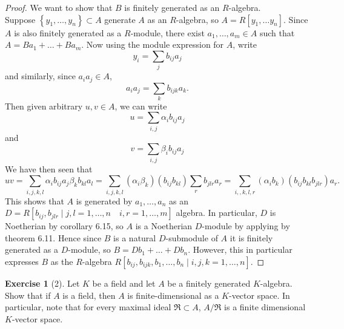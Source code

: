 \documentclass[reqno]{amsart}
\theoremstyle{definition}
\newtheorem{exercise}[theorem]{Exercise}
\theoremstyle{remark}
\begin{document}
    \begin{proof}
        We want to show that
        $B$ is finitely generated as an $R$-algebra.\\

        Suppose $\left\{ y_1, \ldots, y_n \right\} \subset A$
        generate $A$ as an $R$-algebra, so
        $A = R \left[ y_1, \ldots y_n \right] $.
        Since $A$ is also finitely generated
        as a $R$-module, there
        exist $a_1, \ldots, a_m \in A$ such that
        $A = Ba_1 + \ldots + Ba_m$.
        Now using the module expression for $A$, write
        \[
        y_i = \sum_j b_{ij} a_j
        \]
        and similarly, since
        $a_i a_j \in A$,
        \[
        a_i a_j = \sum_k b_{ijk} a_k.
        \]
        Then given arbitrary
        $u,v \in A$,
        we can write
        \[
        u = \sum_{i,j} \alpha_i b_{ij} a_{j}
        \]
        and
         \[
        v = \sum_{i,j} \beta_i b_{ij} a_{j}
        \]
        We have then seen that
        \[
        uv = \sum_{i,j,k,l} \alpha_i b_{ij} a_j \beta_k b_{kl}a_l
        = \sum_{i,j,k,l} \left( \alpha_i \beta_k \right)
        \left( b_{ij} b_{kl} \right) \sum_{r} b_{jlr} a_r
        = \sum_{i,,k,l,r} \left( \alpha_i b_{k} \right)
        \left( b_{ij} b_{kl} b_{jlr} \right) a_r.
        \]
        This shows that
        $A$ is generated by
        $a_1, \ldots, a_n$  as an
        $D = R \left[ b_{ij}, b_{jlr} \mid
        j,l = 1,\ldots, n \quad
    i,r = 1,\ldots,m\right] $ algebra.
        In particular, $D$ is Noetherian by corollary
        6.15, so $A$ is a Noetherian
        $D$-module by applying by
        theorem 6.11. Hence
        since
        $B$ is a natural $D$-submodule of $A$ it is
        finitely generated as a $D$-module, so
        $B = D b_1 + \ldots + D b_n$.
        However, this in particular expresses
        $B$ as the $R$-algebra
        $R \left[ b_{ij},b_{ijk}, b_1,\ldots, b_n
         \mid  i,j,k = 1, \ldots, n\right] $.

    \end{proof}

    \begin{exercise}[2]
        Let $K$ be a field and let $A$ be a finitely
        generated $K$-algebra. Show that if
        $A$ is a field, then $A$ is finite-dimensional
        as a $K$-vector space. In particular, note that
        for every maximal ideal
        $\mathfrak{R} \subset A$,
        $A / \mathfrak{R}$ is a finite dimensional
        $K$-vector space.
    \end{exercise}
\end{document}
